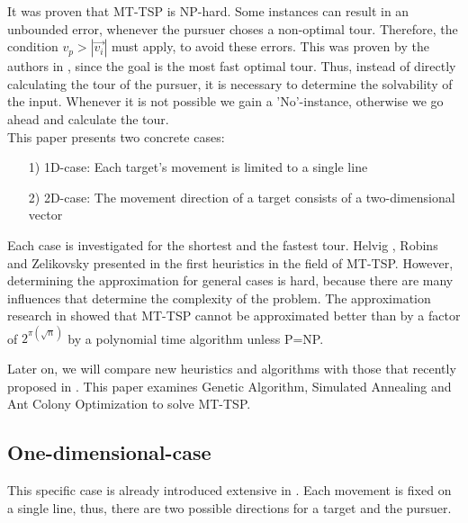 \documentclass{acm_proc_article-sp}
\begin{document}
It was proven that MT-TSP is NP-hard. Some instances can result in an unbounded error, whenever the pursuer choses a non-optimal tour. Therefore, the condition $v_p > |\overrightarrow{v_i}|$ must apply, to avoid these errors. This was proven by the authors in \cite{helvig}, since the goal is the most fast optimal tour.  Thus, instead of directly calculating the tour of the pursuer, it is necessary to determine the solvability of the input. Whenever it is not possible we gain a 'No'-instance, otherwise we go ahead and calculate the tour. \\
This paper presents two concrete cases:
\begin{itemize}
\item[1)]
1D-case: 
Each target's movement is limited to a single line 

\item[2)]
2D-case:
The movement direction of a target consists of a two-dimensional vector 

\end{itemize}

Each case is investigated for the shortest and the fastest tour. Helvig , Robins and Zelikovsky presented in \cite{helvig} the first heuristics in the field of MT-TSP. However, determining the approximation for general cases is hard, because there are many influences that determine the complexity of the problem. The approximation research in \cite{hammar} showed that MT-TSP cannot be approximated better than by a factor of $2^{\pi (\sqrt{n})}$ by a polynomial time algorithm unless P=NP.

Later on, we will compare new heuristics and algorithms with those that recently proposed in \cite{moraes}. This paper examines Genetic Algorithm, Simulated Annealing and Ant Colony Optimization to solve MT-TSP.


\subsection{One-dimensional-case}

This specific case is already introduced extensive in \cite{helvig}. Each movement is fixed on a single line, thus, there are two possible directions for a target and the pursuer. 


\end{document}
